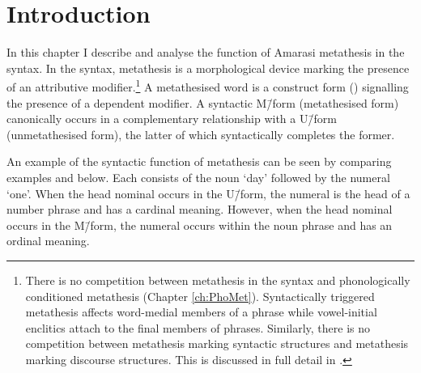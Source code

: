 
\section{Introduction}
In this chapter I describe and analyse the function of Amarasi metathesis in the syntax.
In the syntax, metathesis is a morphological device
marking the presence of an attributive modifier.\footnote{
		There is no competition between metathesis in the syntax
		and phonologically conditioned metathesis (Chapter \ref{ch:PhoMet}).
		Syntactically triggered metathesis affects word-medial members of
		a phrase while vowel-initial enclitics attach to the final members of phrases.
		Similarly, there is no competition between metathesis marking syntactic
		structures and metathesis marking discourse structures.
		This is discussed in full detail in .}
A metathesised word is a construct form ()
signalling the presence of a dependent modifier.
A syntactic M\=/form (metathesised form) canonically
occurs in a complementary relationship
with a \mbox{U\=/form} (unmetathesised form),
the latter of which syntactically completes the former.

An example of the syntactic function of metathesis
can be seen by comparing examples
 and  below.
Each consists of the noun  `day'
followed by the numeral  `one'.
When the head nominal occurs in the U\=/form,
the numeral is the head of a number phrase and has a cardinal meaning.
However, when the head nominal occurs in the M\=/form,
the numeral occurs within the noun phrase and has an ordinal meaning.

\begin{multicols}{2}
	\begin{exe}
	\let\eachwordone=\textnormal
	\let\eachwordtwo=\itshape
		\label{ex:NenoMeseq}
		\label{ex:NeonMeseq}
	\end{exe}
\end{multicols}

